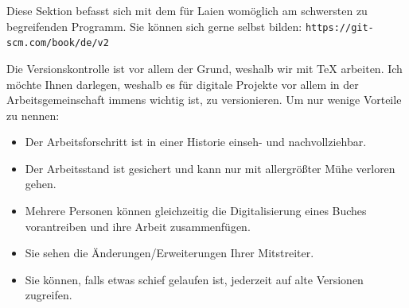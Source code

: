 Diese Sektion befasst sich mit dem für Laien womöglich am schwersten
zu begreifenden Programm. Sie können sich gerne selbst bilden: \texttt{https://git-scm.com/book/de/v2}

Die Versionskontrolle ist vor allem der Grund, weshalb wir mit \TeX{}
arbeiten. Ich möchte Ihnen darlegen, weshalb es für digitale Projekte
vor allem in der Arbeitsgemeinschaft immens wichtig ist, zu versionieren.
Um nur wenige Vorteile zu nennen: 
\begin{itemize}
\item Der Arbeitsforschritt ist in einer Historie einseh- und nachvollziehbar. 
\item Der Arbeitsstand ist gesichert und kann nur mit allergrößter Mühe
verloren gehen. 
\item Mehrere Personen können gleichzeitig die Digitalisierung eines Buches
vorantreiben und ihre Arbeit zusammenfügen. 
\item Sie sehen die Änderungen/Erweiterungen Ihrer Mitstreiter. 
\item Sie können, falls etwas schief gelaufen ist, jederzeit auf alte Versionen
zugreifen. 
\end{itemize}

